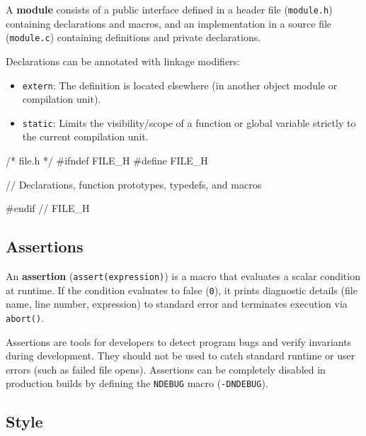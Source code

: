 \begin{definition}
    A \textbf{module} consists of a public interface defined in a header file (\texttt{module.h}) containing declarations and macros, and an implementation in a source file (\texttt{module.c}) containing definitions and private declarations.
\end{definition}

\begin{remark}
    Declarations can be annotated with linkage modifiers:
    \begin{itemize}
        \item \texttt{extern}: The definition is located elsewhere (in another object module or compilation unit).
        \item \texttt{static}: Limits the visibility/scope of a function or global variable strictly to the current compilation unit.
    \end{itemize}
\end{remark}

\begin{codeexample}
/* file.h */
#ifndef FILE_H
#define FILE_H

// Declarations, function prototypes, typedefs, and macros

#endif // FILE_H
\end{codeexample}

\subsection{Assertions}

\begin{definition}
    An \textbf{assertion} (\texttt{assert(expression)}) is a macro that evaluates a scalar condition at runtime. If the condition evaluates to false (\texttt{0}), it prints diagnostic details (file name, line number, expression) to standard error and terminates execution via \texttt{abort()}.
\end{definition}

\begin{remark}
    Assertions are tools for developers to detect program bugs and verify invariants during development. They should not be used to catch standard runtime or user errors (such as failed file opens). Assertions can be completely disabled in production builds by defining the \texttt{NDEBUG} macro (\texttt{-DNDEBUG}).
\end{remark}

\subsection{Style}


